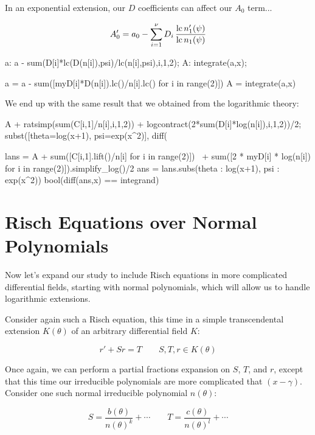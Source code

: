 In an exponential extension, our $D$ coefficients can affect our $A_0$ term...

$$A_0' = a_0 - \sum_{i=1}^\nu D_i \,\frac{{\rm lc\,} n_1'(\psi)}{{\rm lc\,} n_1(\psi)} $$

\begin{maximacode}
a: a - sum(D[i]*lc(D(n[i]),psi)/lc(n[i],psi),i,1,2);
A: integrate(a,x);
\end{maximacode}

\begin{sageblock}
a = a - sum([myD[i]*D(n[i]).lc()/n[i].lc() for i in range(2)])
A = integrate(a,x)
\end{sageblock}

We end up with
the same result that we obtained from the logarithmic theory:

\begin{maximacode}
A + ratsimp(sum(C[i,1]/n[i],i,1,2))
  + logcontract(2*sum(D[i]*log(n[i]),i,1,2))/2;
subst([theta=log(x+1), psi=exp(x^2)], %
diff(%
\end{maximacode}

\begin{sagespacedblock}
lans = A + sum([C[i,1].lift()/n[i] for i in range(2)]) \
  + sum([2 * myD[i] * log(n[i]) for i in range(2)]).simplify_log()/2
ans = lans.subs({theta : log(x+1), psi : exp(x^2)})
bool(diff(ans,x) == integrand)
\end{sagespacedblock}

\endexample

\vfill\eject
\section{Risch Equations over Normal Polynomials}

Now let's expand our study to include Risch equations in more
complicated differential fields, starting with normal polynomials,
which will allow us to handle logarithmic extensions.

Consider again such a Risch equation, this time in a simple
transcendental extension $K(\theta)$ of an arbitrary differential
field $K$:

$$r' + S r = T \qquad S,T,r \in K(\theta)$$

Once again, we can perform a partial fractions expansion on $S$, $T$,
and $r$, except that this time our irreducible polynomials are more
complicated that $(x-\gamma)$.  Consider one such normal irreducible
polynomial $n(\theta)$:

$$S = \frac{b(\theta)}{n(\theta)^k} + \cdots
\qquad T = \frac{c(\theta)}{n(\theta)^l} + \cdots$$

